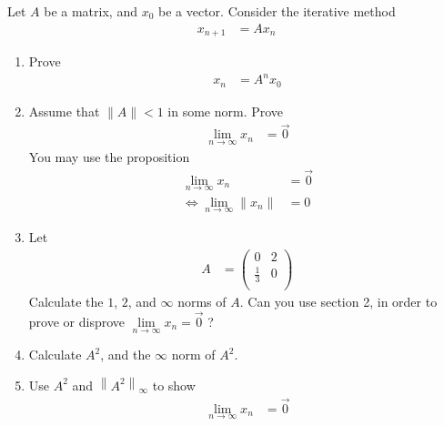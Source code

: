 \documentclass[fleqn, a4paper, 11pt, oneside]{amsart}
\theoremstyle{definition}
\theoremstyle{theorem}
\begin{document}
\begin{question}
	Let $A$ be a matrix, and $x_0$ be a vector.
	Consider the iterative method
	\begin{align*}
		x_{n + 1} & = A x_n
	\end{align*}
	\begin{enumerate}
		\item
			Prove
			\begin{align*}
				x_n & = A^n x_0
			\end{align*}
		\item
			Assume that $\|A\| < 1$ in some norm.
			Prove
			\begin{align*}
				\lim\limits_{n \to \infty} x_n & = \overrightarrow{0}
			\end{align*}
			You may use the proposition
			\begin{align*}
				\lim\limits_{n \to \infty} x_n          & = \overrightarrow{0} \\
				\iff \lim\limits_{n \to \infty} \|x_n\| & = 0
			\end{align*}
		\item
			Let
			\begin{align*}
				A &=
					\begin{pmatrix}
						0           & 2 \\
						\frac{1}{3} & 0 \\
					\end{pmatrix}
			\end{align*}
			Calculate the $1$, $2$, and $\infty$ norms of $A$.
			Can you use section 2, in order to prove or disprove $\lim\limits_{n \to \infty} x_n = \overrightarrow{0}$ ?
		\item
			Calculate $A^2$, and the $\infty$ norm of $A^2$.
		\item
			Use $A^2$ and $\left\| A^2 \right\|_{\infty}$ to show
			\begin{align*}
				\lim\limits_{n \to \infty} x_n & = \overrightarrow{0}
			\end{align*}
	\end{enumerate}
\end{question}
\end{document}
